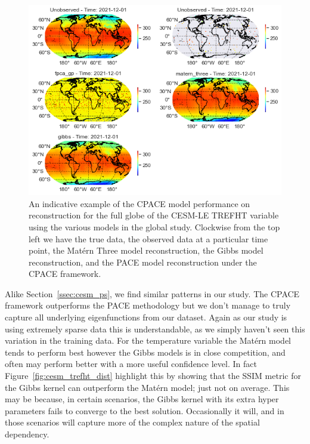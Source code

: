 \begin{figure}
	\centering
	\includegraphics[width=\textwidth]{full_ex_trefht_globe}
	\caption{An indicative example of the CPACE model performance on reconstruction for the full globe of the CESM-LE TREFHT variable using the various models in the global study. Clockwise from the top left we have the true data, the observed data at a particular time point, the Mat\'ern Three model reconstruction, the Gibbs model reconstruction, and the PACE model reconstruction under the CPACE framework.}
	\label{fig:full_ex_trefht_globe}
\end{figure}

Alike Section~\ref{ssec:cesm_ps}, we find similar patterns in our study.
The CPACE framework outperforms the PACE methodology but we don't manage to truly capture all underlying eigenfunctions from our dataset.
Again as our study is using extremely sparse data this is understandable, as we simply haven't seen this variation in the training data.
For the temperature variable the Mat\'ern model tends to perform best however the Gibbs models is in close competition, and often may perform better with a more useful confidence level.
In fact Figure~\ref{fig:cesm_trefht_dist} highlight this by showing that the SSIM metric for the Gibbs kernel can outperform the Mat\'ern model; just not on average.
This may be because, in certain scenarios, the Gibbs kernel with its extra hyper parameters fails to converge to the best solution. 
Occasionally it will, and in those scenarios will capture more of the complex nature of the spatial dependency. 

